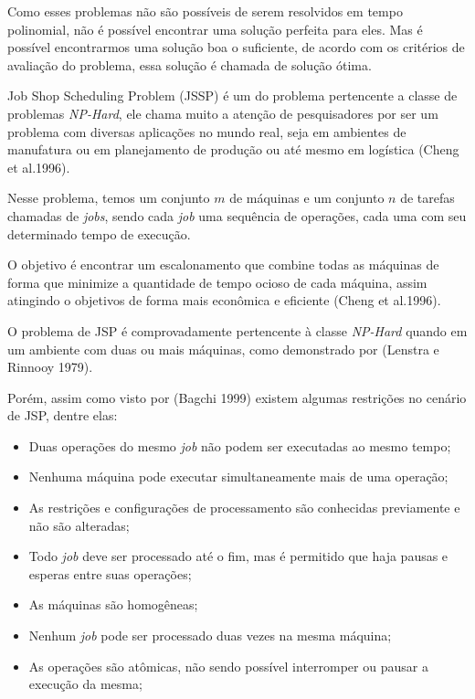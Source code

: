 Como esses problemas não são possíveis de serem resolvidos em tempo polinomial, não é possível encontrar uma solução perfeita para eles. Mas é possível encontrarmos uma solução boa o suficiente, de acordo com os critérios de avaliação do problema, essa solução é chamada de solução ótima.\newline

Job Shop Scheduling Problem (JSSP) é um do problema pertencente a classe de problemas \textit{NP-Hard}, ele chama muito a atenção de pesquisadores por ser um problema com diversas aplicações no mundo real, seja em ambientes de manufatura ou em planejamento de produção ou até mesmo em logística (Cheng et al.1996).\newline

Nesse problema, temos um conjunto $m$ de máquinas e um conjunto $n$ de tarefas chamadas de \textit{jobs}, sendo cada \textit{job} uma sequência de operações, cada uma com seu determinado tempo de execução. \newline 

O objetivo é encontrar um escalonamento que combine todas as máquinas de forma que minimize a quantidade de tempo ocioso de cada máquina, assim atingindo o objetivos de forma mais econômica e eficiente (Cheng et al.1996). \newline

O problema de JSP é comprovadamente pertencente à classe \textit{NP-Hard} quando em um ambiente com duas ou mais máquinas, como demonstrado por (Lenstra e Rinnooy 1979). \newline

Porém, assim como visto por (Bagchi 1999) existem algumas restrições no cenário de JSP, dentre elas:
\begin{itemize}
    \item Duas operações do mesmo \textit{job} não podem ser executadas ao mesmo tempo;
    \item Nenhuma máquina pode executar simultaneamente mais de uma operação;
    \item As restrições e configurações de processamento são conhecidas previamente e não são alteradas;
    \item Todo \textit{job} deve ser processado até o fim, mas é permitido que haja pausas e esperas entre suas operações;
    \item As máquinas são homogêneas;
    \item Nenhum \textit{job} pode ser processado duas vezes na mesma máquina;
    \item As operações são atômicas, não sendo possível interromper ou pausar a execução da mesma;
\end{itemize}

